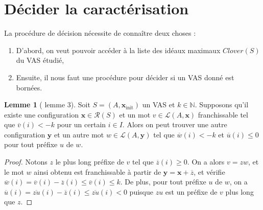 \documentclass[a4paper,final]{article}
\theoremstyle{definition}
\newtheorem{Lemma}[Theorem]{Lemme}
\let\leq\leqslant
\let\geq\geqslant
\newcommand{\os}[1]{\left\{\mathinner{#1}\right\}}
\newcommand{\N}{\ensuremath{\mathbb{N}}}
\newcommand{\lang}{\ensuremath{\mathcal{L}}}
\newcommand{\reach}{\ensuremath{\mathcal{R}}}
\newcommand{\clover}{\textit{Clover}}
\newcommand{\vect}[1]{\ensuremath{\mathbf{#1}}}
\newcommand{\xinit}{\ensuremath{\vect{x}_\text{init}}}
\newcommand{\valeur}[1]{\ensuremath{\overline{#1}}}
\begin{document}


\section{Décider la caractérisation}

La procédure de décision nécessite de connaître deux choses :
\begin{enumerate}
    \item D'abord, on veut pouvoir accéder à la liste des idéaux maximaux $\clover(S)$ du VAS étudié,
    \item Ensuite, il nous faut une procédure pour décider si un VAS donné est bornées.
\end{enumerate}

\begin{Lemma}[\cite{giyo80} lemme 3]\label{mot décroissant}
    Soit $S=(A,\xinit)$ un VAS et $k\in\N$.
    Supposons qu'il existe une configuration $\vect{x}\in \reach(S)$ et un mot $v\in\lang(A,\vect{x})$ franchissable tel que $\valeur{v}(i) < -k$ pour un certain $i \in I$.
    Alors on peut trouver une autre configuration $\vect{y}$ et un autre mot $w\in\lang(A,\vect{y})$ tel que $\valeur{w}(i) < -k$ et $\valeur{u}(i) \leq 0$ pour tout préfixe $u$ de $w$.
\end{Lemma}

\begin{proof}
Notons $z$ le plus long préfixe de $v$ tel que $\valeur{z}(i) \geq 0$.
On a alors $v = zw$, et le mot $w$ ainsi obtenu est franchissable à partir de $\vect{y} = \vect{x} + \valeur{z}$, 
et vérifie $\valeur{w}(i) = \valeur{v}(i) - \valeur{z}(i) \leq \valeur{v}(i) \leq k$.
De plus, pour tout préfixe $u$ de $w$, on a $\valeur{u}(i) = \valeur{zu}(i) - \valeur{z}(i) \leq \valeur{zu}(i) < 0$ puisque $zu$ est un préfixe de $v$ plus long que $z$.
\end{proof}
\end{document}

